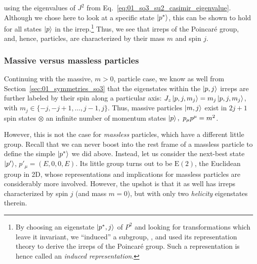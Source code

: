 using the eigenvalues of $J^2$ from Eq.~\ref{eq:01_so3_su2_casimir_eigenvalue}.
Although we chose here to look at a specific state $\ket{p^*}$, this can be shown to hold for all states $\ket{p}$ in the irrep.\footnote{By choosing an eigenstate $\ket{p^*, j}$ of $P^2$ and looking for transformations which leave it invariant, we ``induced'' a subgroup, \SO[3], and used its representation theory to derive the irreps of the Poincaré group. Such a representation is hence called an \textit{induced representation}.}
Thus, we see that irreps of the Poincaré group, and, hence, particles, are characterized by their mass $m$ and spin $j$.

\subsubsection{Massive versus massless particles}

Continuing with the massive, $m > 0$, particle case, we know as well from Section~\ref{sec:01_symmetries_so3} that the eigenstates within the $\ket{p, j}$ irreps are further labeled by their spin along a particular axis: $J_z\ket{p, j, m_j} = m_j\ket{p, j, m_j}$, with $m_j \in \{-j, -j+1, \ldots, j-1, j\}$.
Thus, massive particles $\ket{m, j}$ exist in $2j+1$ spin states $\otimes$ an infinite number of momentum states $\ket{p},\ p_\mu p^\mu = m^2$.

However, this is not the case for \textit{massless} particles, which have a different little group.
Recall that we can never boost into the rest frame of a massless particle to define the simple $\ket{p^*}$ we did above.
Instead, let us consider the next-best state $\ket{p'}$, $p'_\mu = (E, 0, 0, E)$.
Its little group turns out to be $\mathrm{E}(2)$, the Euclidean group in 2D, whose representations and implications for massless particles are considerably more involved.
However, the upshot is that it as well has irreps characterized by spin $j$ (and mass $m = 0$), but with only two \textit{helicity} eigenstates therein.

